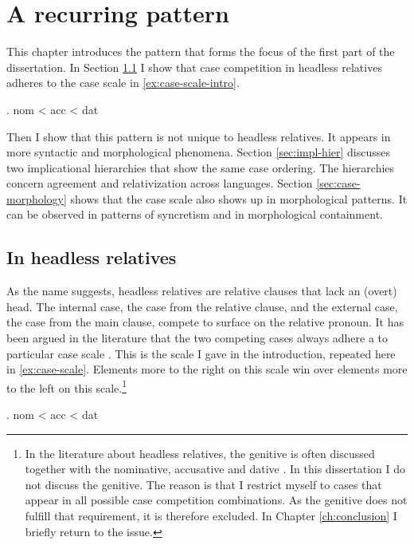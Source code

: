 
\chapter{A recurring pattern}\label{ch:recurring}

This chapter introduces the pattern that forms the focus of the first part of the dissertation. In Section \ref{sec:pattern-rels} I show that case competition in headless relatives adheres to the case scale in \ref{ex:case-scale-intro}.

\ex. \ac{nom} < \ac{acc} < \ac{dat}\label{ex:case-scale-intro}

Then I show that this pattern is not unique to headless relatives. It appears in more syntactic and morphological phenomena. Section \ref{sec:impl-hier} discusses two implicational hierarchies that show the same case ordering. The hierarchies concern agreement and relativization across languages. Section \ref{sec:case-morphology} shows that the case scale also shows up in morphological patterns. It can be observed in patterns of syncretism and in morphological containment.


\section{In headless relatives}\label{sec:pattern-rels}

As the name suggests, headless relatives are relative clauses that lack an (overt) head. The internal case, the case from the relative clause, and the external case, the case from the main clause, compete to surface on the relative pronoun. It has been argued in the literature that the two competing cases always adhere a to particular case scale \citep[cf.][]{harbert1978,pittner1995,vogel2001,grosu2003,caha2019,bergsma2019}. This is the scale I gave in the introduction, repeated here in \ref{ex:case-scale}. Elements more to the right on this scale win over elements more to the left on this scale.\footnote{
In the literature about headless relatives, the genitive is often discussed together with the nominative, accusative and dative \citep[cf.][]{harbert1978,pittner1995}. In this dissertation I do not discuss the genitive. The reason is that I restrict myself to cases that appear in all possible case competition combinations. As the genitive does not fulfill that requirement, it is therefore excluded. In Chapter \ref{ch:conclusion} I briefly return to the issue.
}

\ex. \ac{nom} < \ac{acc} < \ac{dat}\label{ex:case-scale}


